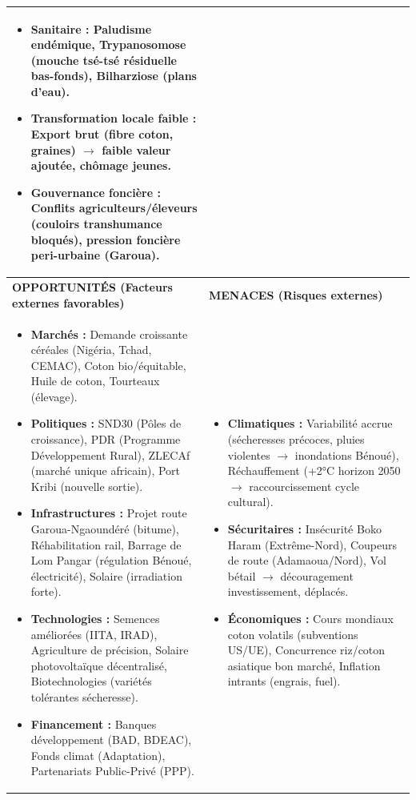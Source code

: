 \documentclass[11pt]{article}
\begin{document}
\begin{exoresolu}
\begin{center}
\begin{tabularx}{\linewidth}{|X|X|}
\begin{itemize}
    \item \textbf{Sanitaire :} Paludisme endémique, Trypanosomose (mouche tsé-tsé résiduelle bas-fonds), Bilharziose (plans d'eau).
    \item \textbf{Transformation locale faible :} Export brut (fibre coton, graines) $\rightarrow$ faible valeur ajoutée, chômage jeunes.
    \item \textbf{Gouvernance foncière :} Conflits agriculteurs/éleveurs (couloirs transhumance bloqués), pression foncière peri-urbaine (Garoua).
\end{itemize} \\ \hline
\rowcolor{poporangeL} \textbf{OPPORTUNITÉS (Facteurs externes favorables)} & \textbf{MENACES (Risques externes)} \\ \hline
\begin{itemize}
    \item \textbf{Marchés :} Demande croissante céréales (Nigéria, Tchad, CEMAC), Coton bio/équitable, Huile de coton, Tourteaux (élevage).
    \item \textbf{Politiques :} SND30 (Pôles de croissance), PDR (Programme Développement Rural), ZLECAf (marché unique africain), Port Kribi (nouvelle sortie).
    \item \textbf{Infrastructures :} Projet route Garoua-Ngaoundéré (bitume), Réhabilitation rail, Barrage de Lom Pangar (régulation Bénoué, électricité), Solaire (irradiation forte).
    \item \textbf{Technologies :} Semences améliorées (IITA, IRAD), Agriculture de précision, Solaire photovoltaïque décentralisé, Biotechnologies (variétés tolérantes sécheresse).
    \item \textbf{Financement :} Banques développement (BAD, BDEAC), Fonds climat (Adaptation), Partenariats Public-Privé (PPP).
\end{itemize} & \begin{itemize}
    \item \textbf{Climatiques :} Variabilité accrue (sécheresses précoces, pluies violentes $\rightarrow$ inondations Bénoué), Réchauffement (+2°C horizon 2050 $\rightarrow$ raccourcissement cycle cultural).
    \item \textbf{Sécuritaires :} Insécurité Boko Haram (Extrême-Nord), Coupeurs de route (Adamaoua/Nord), Vol bétail $\rightarrow$ découragement investissement, déplacés.
    \item \textbf{Économiques :} Cours mondiaux coton volatils (subventions US/UE), Concurrence riz/coton asiatique bon marché, Inflation intrants (engrais, fuel).

\end{itemize}
\end{tabularx}
\end{center}
\end{exoresolu}
\end{document}
